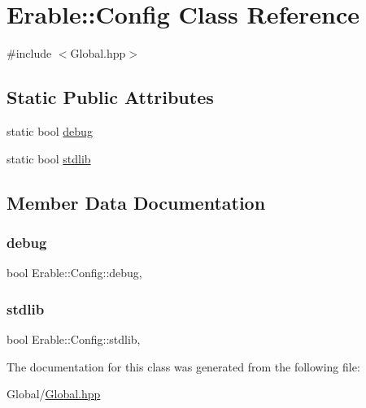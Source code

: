 \hypertarget{class_erable_1_1_config}{}\section{Erable\+::Config Class Reference}
\label{class_erable_1_1_config}


{\ttfamily \#include $<$Global.\+hpp$>$}

\subsection*{Static Public Attributes}
\begin{DoxyCompactItemize}
\item 
static bool \mbox{\hyperlink{class_erable_1_1_config_acc39c2279f6c13e8f483787227c6dbb4}{debug}}
\item 
static bool \mbox{\hyperlink{class_erable_1_1_config_aff7dbd50b543bd5339a490063194b15c}{stdlib}}
\end{DoxyCompactItemize}


\subsection{Member Data Documentation}
\mbox{\label{class_erable_1_1_config_acc39c2279f6c13e8f483787227c6dbb4}} 
\subsubsection{\texorpdfstring{debug}{debug}}
{\footnotesize\ttfamily bool Erable\+::\+Config\+::debug\hspace{0.3cm}{\ttfamily [inline]}, {\ttfamily [static]}}

\mbox{\label{class_erable_1_1_config_aff7dbd50b543bd5339a490063194b15c}} 
\subsubsection{\texorpdfstring{stdlib}{stdlib}}
{\footnotesize\ttfamily bool Erable\+::\+Config\+::stdlib\hspace{0.3cm}{\ttfamily [inline]}, {\ttfamily [static]}}



The documentation for this class was generated from the following file\+:\begin{DoxyCompactItemize}
\item 
Global/\mbox{\hyperlink{_global_8hpp}{Global.\+hpp}}\end{DoxyCompactItemize}
